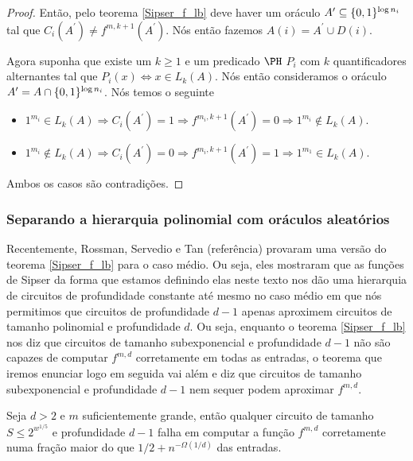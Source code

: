 \begin{proof}
Então, pelo teorema \ref{Sipser_f_lb} deve haver um oráculo $A^{\prime} \subseteq \{0, 1\}^{\log n_{i}}$ tal que $C_{i}(A^{\prime}) \neq f^{m, k + 1}(A^{\prime})$. Nós então fazemos $A(i) = A^{\prime} \cup D(i)$.

Agora suponha que existe um $k \geq 1$ e um predicado $\PH$ $P_{i}$ com $k$ quantificadores alternantes tal que $P_{i}(x) \iff x \in L_{k}(A)$. Nós então consideramos o oráculo $A^{\prime} = A \cap \{0, 1\}^{\log n_{i}}$. Nós temos o seguinte

\begin{itemize}

	\item $1^{m_{i}} \in L_{k}(A) \Rightarrow C_{i}(A^{\prime}) = 1 \Rightarrow f^{m_{i}, k + 1}(A^{\prime}) = 0 \Rightarrow 1^{m_{i}} \not\in L_{k}(A)$.
	
	\item $1^{m_{i}} \not\in L_{k}(A) \Rightarrow C_{i}(A^{\prime}) = 0 \Rightarrow f^{m_{i}, k + 1}(A^{\prime}) = 1 \Rightarrow 1^{m_{1}} \in L_{k}(A)$.

\end{itemize}

Ambos os casos são contradições.

\end{proof}

\subsubsection{Separando a hierarquia polinomial com oráculos aleatórios}

Recentemente, Rossman, Servedio e Tan (referência) provaram uma versão do teorema \ref{Sipser_f_lb} para o caso médio. Ou seja, eles mostraram que as funções de Sipser da forma que estamos definindo elas neste texto nos dão uma hierarquia de circuitos de profundidade constante até mesmo no caso médio em que nós permitimos que circuitos de profundidade $d - 1$ apenas aproximem circuitos de tamanho polinomial e profundidade $d$. Ou seja, enquanto o teorema \ref{Sipser_f_lb} nos diz que circuitos de tamanho subexponencial e profundidade $d - 1$ não são capazes de computar $f^{m, d}$ corretamente em todas as entradas, o teorema que iremos enunciar logo em seguida vai além e diz que circuitos de tamanho subexponencial e profundidade $d -1$ nem sequer podem aproximar $f^{m, d}$.

\begin{teo} \label{Sipser_f_lb_app}

Seja $d > 2$ e $m$ suficientemente grande, então qualquer circuito de tamanho $S \leq 2^{w^{1/5}}$ e profundidade $d - 1$ falha em computar a função $f^{m, d}$ corretamente numa fração maior do que $1/2 + n^{-\Omega(1/d)}$ das entradas.

\end{teo}

